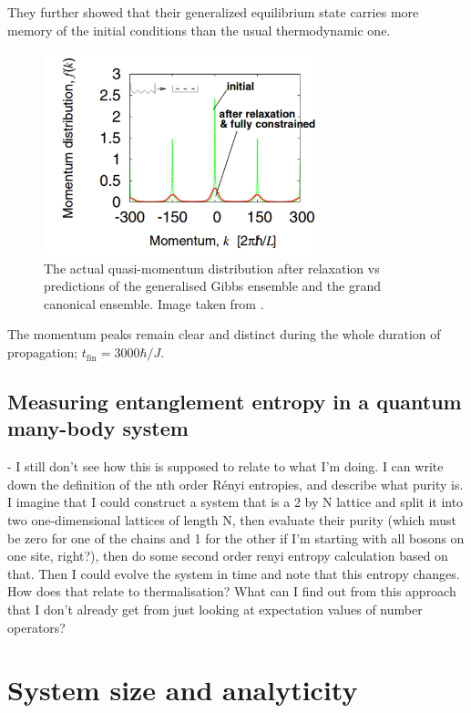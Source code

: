 \documentclass[a4paper,10pt]{article}
\theoremstyle{plain}
\begin{document}
They further showed that their generalized equilibrium state carries more 
memory of the initial conditions than the usual thermodynamic one.

\begin{figure}[H]
 \begin{center}
 \includegraphics[width=8cm]{after_relaxation_rigol}
 \end{center}
 \caption{The actual quasi-momentum distribution after relaxation vs 
 predictions of the generalised Gibbs ensemble and the grand canonical 
 ensemble. Image taken from \cite{Rigol2007}.}
 \end{figure}

The momentum peaks remain clear and distinct during the whole duration  of  
propagation; $t_{\text{fin}}=3000\hbar/J$.

\subsection{Measuring entanglement entropy in a quantum many-body system}
- I still don't see how this is supposed to relate to what I'm doing.
I can write down the definition of the nth order R\'enyi entropies, and 
describe what purity is. I imagine that I could construct a system that is a 
2 by N lattice and split it into two one-dimensional lattices of length N,
then evaluate their purity (which must be zero for one of the chains and 1 for 
the other if I'm starting with all bosons on one site, right?), then do some 
second order renyi entropy calculation based on that. Then I could evolve the 
system in time and note that this entropy changes. How does that relate to 
thermalisation? What can I find out from this approach that I don't already 
get from just looking at expectation values of number operators?

\newpage

\section{System size and analyticity}
\end{document}
